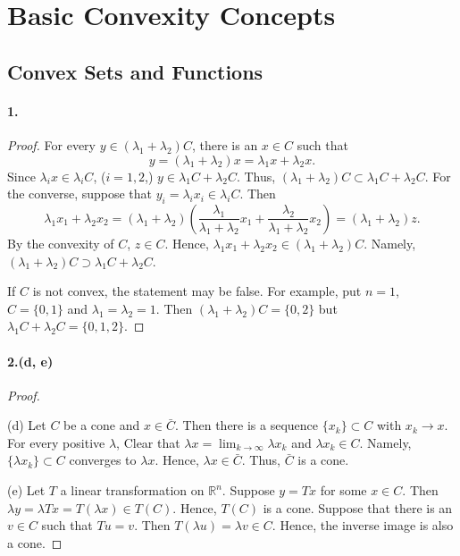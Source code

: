 \section{Basic Convexity Concepts}
\setcounter{subsection}{1}
\subsection{Convex Sets and Functions}
  \paragraph{1.}
  \begin{proof}
    For every $y\in(\lambda_1+\lambda_2)C$, there is an $x\in C$ such that
    \[
      y=(\lambda_1+\lambda_2)x=\lambda_1x+\lambda_2x.
    \]
    Since $\lambda_ix\in\lambda_iC$, ($i=1,2$,) $y\in\lambda_1C+\lambda_2C$. 
    Thus, $(\lambda_1+\lambda_2)C\subset\lambda_1C+\lambda_2C$. For the 
    converse, suppose that $y_i=\lambda_ix_i\in\lambda_iC$. Then
    \[
      \lambda_1x_1+\lambda_2x_2=
      (\lambda_1+\lambda_2)
      \left(\frac{\lambda_1}{\lambda_1+\lambda_2}x_1+
      \frac{\lambda_2}{\lambda_1+\lambda_2}x_2\right)=
      (\lambda_1+\lambda_2)z.
    \] 
    By the convexity of $C$, $z\in C$. Hence, $\lambda_1x_1+\lambda_2x_2\in
    (\lambda_1+\lambda_2)C$. Namely, $(\lambda_1+\lambda_2)C\supset\lambda_1C+
    \lambda_2C$.\par
    If $C$ is not convex, the statement may be false. For example, put $n=1$, 
    $C=\{0,1\}$ and $\lambda_1=\lambda_2=1$. Then $(\lambda_1+\lambda_2)C=
    \{0,2\}$ but $\lambda_1C+\lambda_2C=\{0,1,2\}$.
  \end{proof}
  
  \paragraph{2.(d, e)}
  \begin{proof}
    $\,$\par
    (d) Let $C$ be a cone and $x\in\bar{C}$. Then there is a sequence $\{x_k\}
    \subset C$ with $x_k\to x$. For every positive $\lambda$, Clear that 
    $\lambda x=\lim_{k\to\infty}\lambda x_k$ and $\lambda x_k\in C$. Namely,
    $\{\lambda x_k\}\subset C$ converges to $\lambda x$. Hence, $\lambda x\in
    \bar{C}$. Thus, $\bar{C}$ is a cone.\par
    (e) Let $T$ a linear transformation on $\mathbb{R}^n$. Suppose $y=Tx$ for
    some $x\in C$. Then $\lambda y=\lambda Tx=T(\lambda x)\in T(C)$. Hence, 
    $T(C)$ is a cone. Suppose that there is an $v\in C$ such that $Tu=v$. Then
    $T(\lambda u)=\lambda v\in C$. Hence, the inverse image is also a cone.
  \end{proof}
  
